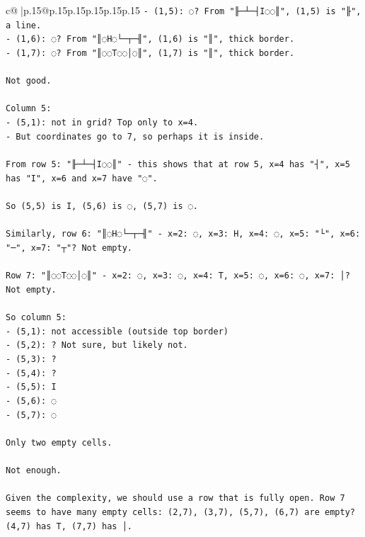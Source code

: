 \documentclass{article}
\begin{document}
{\begin{supertabular}{c@{$\;$}|p{.15\linewidth}@{}p{.15\linewidth}p{.15\linewidth}p{.15\linewidth}p{.15\linewidth}p{.15\linewidth}}
{{{\texttt{{-} (1,5): ◌? From "╟─┴─┤I◌◌║", (1,5) is "╟", a line.} \\
\texttt{{-} (1,6): ◌? From "║◌H◌└─┬─╢", (1,6) is "║", thick border.} \\
\texttt{{-} (1,7): ◌? From "║◌◌T◌◌│◌║", (1,7) is "║", thick border.} \\
\\ 
\texttt{Not good.} \\
\\ 
\texttt{Column 5:} \\
\texttt{{-} (5,1): not in grid? Top only to x=4.} \\
\texttt{{-} But coordinates go to 7, so perhaps it is inside.} \\
\\ 
\texttt{From row 5: "╟─┴─┤I◌◌║" {-} this shows that at row 5, x=4 has "┤", x=5 has "I", x=6 and x=7 have "◌".} \\
\\ 
\texttt{So (5,5) is I, (5,6) is ◌, (5,7) is ◌.} \\
\\ 
\texttt{Similarly, row 6: "║◌H◌└─┬─╢" {-} x=2: ◌, x=3: H, x=4: ◌, x=5: "└", x=6: "─", x=7: "┬"? Not empty.} \\
\\ 
\texttt{Row 7: "║◌◌T◌◌│◌║" {-} x=2: ◌, x=3: ◌, x=4: T, x=5: ◌, x=6: ◌, x=7: │? Not empty.} \\
\\ 
\texttt{So column 5: } \\
\texttt{{-} (5,1): not accessible (outside top border)} \\
\texttt{{-} (5,2): ? Not sure, but likely not.} \\
\texttt{{-} (5,3): ? } \\
\texttt{{-} (5,4): ?} \\
\texttt{{-} (5,5): I} \\
\texttt{{-} (5,6): ◌} \\
\texttt{{-} (5,7): ◌} \\
\\ 
\texttt{Only two empty cells.} \\
\\ 
\texttt{Not enough.} \\
\\ 
\texttt{Given the complexity, we should use a row that is fully open. Row 7 seems to have many empty cells: (2,7), (3,7), (5,7), (6,7) are empty? (4,7) has T, (7,7) has │.} \\
\\ 
}}}
\end{supertabular}}
\end{document}
